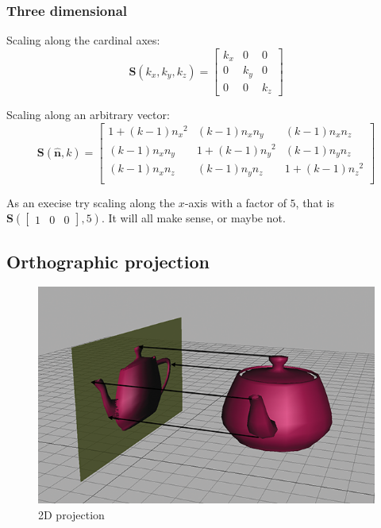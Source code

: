 \documentclass[a4paper,11pt]{article}
\begin{document}
\subsubsection{Three dimensional}

Scaling along the cardinal axes: \\
$$
\mathbf{S}(k_{x},k_{y},k_{z}) = 
\begin{bmatrix}
k_{x} & 0 & 0 \\
0 & k_{y} & 0 \\
0 & 0 & k_{z}
\end{bmatrix}
$$

Scaling along an arbitrary vector: \\
$$
\mathbf{S}(\hat{\mathbf{n}},k) = \begin{bmatrix}
{1 + \left( k - 1 \right){n_{x}}^{2}} & {\left( k - 1 \right)n_{x}n_{y}} & {\left( k - 1 \right)n_{x}n_{z}} \\
{\left( k - 1 \right)n_{x}n_{y}} & {1 + \left( k - 1 \right){n_{y}}^{2}} & {\left( k - 1 \right)n_{y}n_{z}} \\
{\left( k - 1 \right)n_{x}n_{z}} & {\left( k - 1 \right)n_{y}n_{z}} & {1 + \left( k - 1 \right){n_{z}}^{2}} \\
\end{bmatrix}
$$

As an execise try scaling along the $x$-axis with a factor of $5$, that is $\mathbf{S}(
\begin{bmatrix}
1 & 0 & 0
\end{bmatrix},5)$. It will all make sense, or maybe not.

\subsection{Orthographic projection}

\begin{figure}[H]
\centering
    \includegraphics{05_projection}
\caption{2D projection}
\label{fig:2d-projection}
\end{figure}
\end{document}
